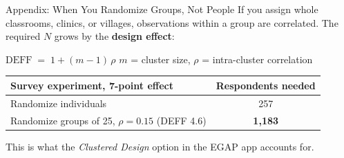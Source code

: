 \documentclass[
  ignorenonframetext,
  aspectratio=169,
]{beamer}
\begin{document}
\begin{frame}{Appendix: When You Randomize Groups, Not People}
\label{appendix-when-you-randomize-groups-not-people}
\small If you assign whole classrooms, clinics, or villages,
observations within a group are correlated. The required \(N\) grows by
the \textbf{design effect}:

\vspace{0.3em}

\begin{center}
$\text{DEFF} \;=\; 1 + (m - 1)\,\rho$ \qquad \footnotesize $m$ = cluster size, \; $\rho$ = intra-cluster correlation
\end{center}

\vspace{0.5em}

\begin{center}
\small
\setlength{\tabcolsep}{7pt}
\renewcommand{\arraystretch}{1.25}
\begin{tabular}{>{\raggedright\arraybackslash}p{7.2cm}c}
\toprule
\textbf{Survey experiment,} 7-point effect & \textbf{Respondents needed} \\
\midrule
Randomize individuals                                    & 257 \\
Randomize groups of 25, $\rho = 0.15$ (DEFF 4.6)         & \textbf{1,183} \\
\bottomrule
\end{tabular}
\end{center}

\vspace{0.5em}

\begin{center}
\small This is what the \textit{Clustered Design} option in the EGAP app accounts for.
\end{center}
\end{frame}
\end{document}
